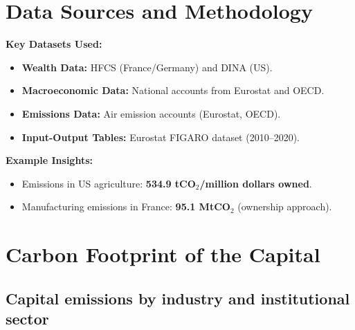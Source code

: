 \documentclass[10pt]{beamer}
\begin{document}
\section{Data Sources and Methodology}
\begin{frame}
    \textbf{Key Datasets Used:}
    \begin{itemize}
        \item \textbf{Wealth Data:} HFCS (France/Germany) and DINA (US).
        \item \textbf{Macroeconomic Data:} National accounts from Eurostat and OECD.
        \item \textbf{Emissions Data:} Air emission accounts (Eurostat, OECD).
        \item \textbf{Input-Output Tables:} Eurostat FIGARO dataset (2010–2020).
    \end{itemize}

    \textbf{Example Insights:}
    \begin{itemize}
        \item Emissions in US agriculture: \textbf{534.9 tCO$_2$/million dollars owned}.
        \item Manufacturing emissions in France: \textbf{95.1 MtCO$_2$} (ownership approach).
    \end{itemize}
\end{frame}

\section{Carbon Footprint of the Capital}
\begin{frame}{\secname}
    \tableofcontents[currentsection, hideothersubsections, sections=\value{section}]
\end{frame}

\subsection{Capital emissions by industry and institutional sector}
\end{document}
